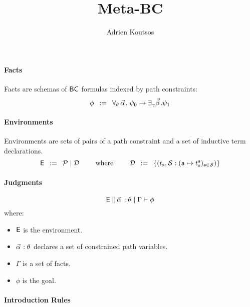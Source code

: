 \documentclass[a4paper]{article}
\theoremstyle{remark}
\begin{document}
\title{Meta-BC}


\author{Adrien Koutsos}

\maketitle

\paragraph{Facts}
Facts are schemas of $\bc$ formulas indexed by path constraints:
\[
  \phi \mdef
  \cforall_\theta\, \valpha.\;
  \psi_0
  \ra
  \cexists_\gamma \vbeta. \psi_1
\]

\paragraph{Environments}
Environments are sets of pairs of a path constraint and a set of inductive term declarations.
\[
  \env \mdef
  \pcnstr \mid
  \decls
  \qquad
  \text{ where }
  \qquad
  \decls \mdef
  \left\{
    \decl{t_\sfx}{\aset}
    {(\act \mapsto t_\sfx^\act)_{\act \in \aset}}
  \right\}
\]

\paragraph{Judgments}
\[
  \judge{\env}{\facts{\valpha}{\theta}{\Gamma}}{\phi}
\]
where:
\begin{itemize}
\item $\env$ is the environment.
\item $\pvtype{\valpha}{\theta}$ declares a set of constrained path variables.
\item $\Gamma$ is a set of facts.
\item $\phi$ is the goal.
\end{itemize}

\paragraph{Introduction Rules}
\begin{mathpar}

\end{mathpar}
\end{document}

